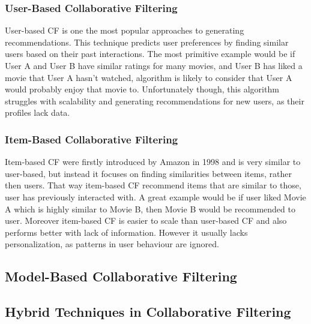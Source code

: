 \documentclass[10pt,a4paper]{article}
\begin{document}
\subsubsection{User-Based Collaborative Filtering}
User-based CF is one the most popular approaches to generating recommendations. This technique predicts user preferences by finding similar users based on their past interactions. The most primitive example would be if User A and User B have similar ratings for many movies, and User B has liked a movie that User A hasn't watched, algorithm is likely to consider that User A would probably enjoy that movie to. Unfortunately though, this algorithm struggles with scalability and generating recommendations for new users, as their profiles lack data. 
\subsubsection{Item-Based Collaborative Filtering}
Item-based CF were firstly introduced by Amazon in 1998 and is very similar to user-based, but instead it focuses on finding similarities between items, rather then users. That way item-based CF recommend items that are similar to those, user has previously interacted with. A great example would be if user liked Movie A which is highly similar to Movie B, then Movie B would be recommended to user. Moreover item-based CF is easier to scale than user-based CF and also performs better with lack of information. However it usually lacks personalization, as patterns in user behaviour are ignored. 
\subsection{Model-Based Collaborative Filtering}
\subsection{Hybrid Techniques in Collaborative Filtering} 

\cite{10.1155/2009/421425}
\cite{8506344}
\label{sec:types_of_collaborative_filtering}




\end{document}
